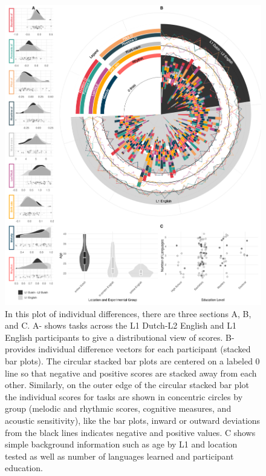 \begin{figure}[H]  %
    \centering
    \includegraphics[width=\textwidth,height=\textheight,keepaspectratio]{viz/combined_plot_circle.png}
    \caption{In this plot of individual differences, there are three sections A, B, and C. A- shows tasks across the L1 Dutch-L2 English and L1 English participants to give a distributional view of scores. B- provides individual difference vectors for each participant (stacked bar plots). The circular stacked bar plots are centered on a labeled 0 line so that negative and positive scores are stacked away from each other. Similarly, on the outer edge of the circular stacked bar plot the individual scores for tasks are shown in concentric circles by group (melodic and rhythmic scores, cognitive measures, and acoustic sensitivity), like the bar plots, inward or outward deviations from the black lines indicates negative and positive values. C shows simple background information such as age by L1 and location tested as well as number of languages learned and participant education.}
    \label{fig:combined_plot}
\end{figure}
\clearpage


